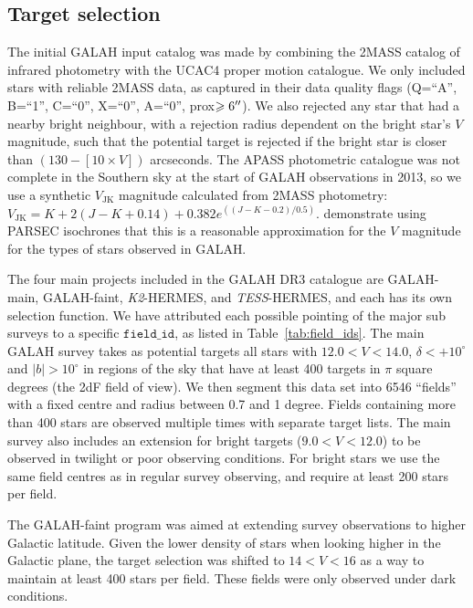 \documentclass[fleqn,usenatbib,useAMS]{mnras}
\newcommand{\tess}{\textit{TESS}\xspace}
\newcommand{\Ktwo}{\textit{K2}\xspace}
\begin{document}
\subsection{Target selection}

The initial GALAH input catalog was made by combining the 2MASS \citep{Skrutskie2006} catalog of infrared photometry with the UCAC4 \citep{Zacharias2013} proper motion catalogue. We only included stars with reliable 2MASS data, as captured in their data quality flags (Q=``A'', B=``1'', C=``0'', X=``0'', A=``0'', prox$\geqslant 6\hbox{$^{\prime\prime}$}$). We also rejected any star that had a nearby bright neighbour, with a rejection radius dependent on the bright star's $V$ magnitude, such that the potential target is rejected if the bright star is closer than $(130-[10\times V])$ arcseconds. The APASS photometric catalogue \citep{Henden2012} was not complete in the Southern sky at the start of GALAH observations in 2013, so we use a synthetic $V_\mathrm{JK}$ magnitude calculated from 2MASS photometry: $V_\mathrm{JK} = K+2(J-K+0.14)+0.382e^{((J-K-0.2)/0.5)}$. \citet{Sharma2018} demonstrate using PARSEC isochrones \citep{Marigo2017} that this is a reasonable approximation for the $V$ magnitude for the types of stars observed in GALAH.

The four main projects included in the GALAH DR3 catalogue are GALAH-main, GALAH-faint, \Ktwo-HERMES, and \tess-HERMES, and each has its own selection function. We have attributed each possible pointing of the major sub surveys to a specific $\texttt{field\_id}$, as listed in Table~\ref{tab:field_ids}. The main GALAH survey takes as potential targets all stars with $12.0<V<14.0$, $\delta < +10^{\circ}$ and $|b|>10^{\circ}$ in regions of the sky that have at least 400 targets in $\pi$ square degrees (the 2dF field of view). We then segment this data set into 6546 ``fields'' with a fixed centre and radius between 0.7 and 1 degree. Fields containing more than 400 stars are observed multiple times with separate target lists. The main survey also includes an extension for bright targets ($9.0<V<12.0$) to be observed in twilight or poor observing conditions. For bright stars we use the same field centres as in regular survey observing, and require at least 200 stars per field.

The GALAH-faint program was aimed at extending survey observations to higher Galactic latitude. Given the lower density of stars when looking higher in the Galactic plane, the target selection was shifted to $14<V<16$ as a way to maintain at least 400 stars per field. These fields were only observed under dark conditions.
\end{document}
